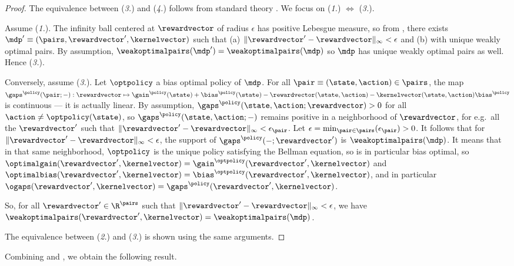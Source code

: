 \documentclass[preprint,cleveref,12pt]{colt2025}
\DeclarePairedDelimiter{\norm}{\lVert}{\rVert}	%
\def\model{\mdp}
\def\kernel{\kernelvector}
\def\reward{\rewardvector}
\def\wkoptpairs{\weakoptimalpairs}
\def\optgain{\optimalgain} %
\def\optbias{\optimalbias} %
\begin{document}
    \begin{proof}
        The equivalence between (\textit{3.}) and (\textit{4.}) follows from standard theory \cite{puterman_markov_1994}.
        We focus on (\textit{1.}) $\Leftrightarrow$ (\textit{3.}). 

        Assume (\textit{1.}).
        The infinity ball centered at $\reward$ of radius $\epsilon$ has positive Lebesgue measure, so from , there exists $\model' \equiv (\pairs, \reward', \kernel)$ such that (a) $\norm{\reward' - \reward}_\infty < \epsilon$ and (b) with unique weakly optimal pairs. 
        By assumption, $\wkoptpairs(\model') = \wkoptpairs(\model)$ so $\model$ has unique weakly optimal pairs as well. 
        Hence (\textit{3.}).

        Conversely, assume (\textit{3.}).
        Let $\optpolicy$ a bias optimal policy of $\model$. 
        For all $\pair \equiv (\state, \action) \in \pairs$, the map $\gaps^\policy(\pair; -) : \reward \mapsto \gain^\policy(\state) + \bias^\policy(\state) - \reward(\state, \action) - \kernel(\state, \action) \bias^\policy$ is continuous --- it is actually linear.
        By assumption, $\gaps^\policy(\state, \action; \reward) > 0$ for all $\action \ne \optpolicy(\state)$, so $\gaps^\policy(\state, \action; -)$ remains positive in a neighborhood of $\reward$, for e.g.~all the $\reward'$ such that $\norm{\reward' - \reward}_\infty < \epsilon_\pair$.
        Let $\epsilon = \min_{\pair \in \pairs} (\epsilon_\pair) > 0$.
        It follows that for $\norm{\reward' - \reward}_\infty < \epsilon$, the support of $\gaps^\policy(-; \reward')$ is $\wkoptpairs(\model)$. 
        It means that in that same neighborhood, $\optpolicy$ is the unique policy satisfying the Bellman equation, so is in particular bias optimal, so $\optgain(\reward', \kernel) = \gain^{\optpolicy}(\reward', \kernel)$ and $\optbias(\reward', \kernel) = \bias^{\optpolicy}(\reward', \kernel)$, and in particular $\ogaps(\reward', \kernel) = \gaps^\policy(\reward', \kernel)$.

        So, for all $\reward' \in \R^\pairs$ such that $\norm{\reward' - \reward}_\infty < \epsilon$, we have $\wkoptpairs(\reward', \kernel) = \wkoptpairs(\model)$. 

        The equivalence between (\textit{2.}) and (\textit{3.}) is shown using the same arguments. 
    \end{proof}

    Combining  and , we obtain the following result.
\end{document}
